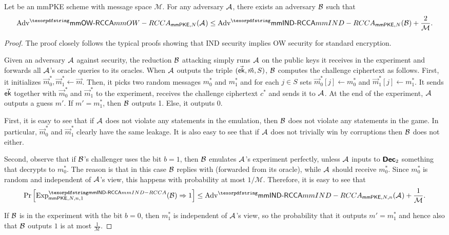 \begin{theorem}
Let \mmPKE be an mmPKE scheme with message space $\mathcal M$. For any adversary $\mathcal{A}_{\relax}$, there exists an adversary $\mathcal{B}_{\relax}$ such that
\begin{equation*}
  \textnormal{Adv}^\mmowrcca_{\mmPKE,N}(\Adv) \leq \textnormal{Adv}^\mmindrcca_{\mmPKE,N}(\Bdv) + \frac{2}{\mathcal M}.
\end{equation*}
\end{theorem}
\begin{proof}
  The proof closely follows the typical proofs showing that IND security implies OW security for standard encryption.
  
  Given an adversary $\mathcal{A}_{\relax}$ against \mmowrcca security, the reduction $\mathcal{B}_{\relax}$ attacking \mmindrcca simply runs $\mathcal{A}_{\relax}$ on the public keys it receives in the \mmindrcca experiment and forwards all $\mathcal{A}_{\relax}$'s oracle queries to its \mmindrcca oracles.
  When $\mathcal{A}_{\relax}$ outputs the triple $(\vec{{\mathsf{ek}}}, \vec m, S)$, $\mathcal{B}_{\relax}$ computes the challenge ciphertext as follows.
  First, it initializes $\vec m_0^*, \vec m_1^* \gets \vec m$. Then, it picks two random messages $m_0^*$ and $m_1^*$ and for each $j\in S$ sets $\vec m_0^*[j] \gets m_0^*$ and $\vec m_1^*[j] \gets m_1^*$. It sends $\vec{{\mathsf{ek}}}$ together with $\vec m_0^*$ and $\vec m_1^*$ to the \mmindrcca experiment, receives the challenge ciphertext $c^*$ and sends it to $\mathcal{A}_{\relax}$.
  At the end of the experiment, $\mathcal{A}_{\relax}$ outputs a guess $m'$. If $m'=m_1^*$, then $\mathcal{B}_{\relax}$ outputs 1. Else, it outputs 0.

  First, it is easy to see that if $\mathcal{A}_{\relax}$ does not violate any \KwReq{} statements in the emulation, then $\mathcal{B}_{\relax}$ does not violate any \KwReq{} statements in the \mmindrcca game. In particular, $\vec m_0^*$ and $\vec m_1^*$ clearly have the same leakage.
  It is also easy to see that if $\mathcal{A}_{\relax}$ does not trivially win by corruptions then $\mathcal{B}_{\relax}$ does not either.

  Second, observe that if $\mathcal{B}_{\relax}$'s challenger uses the bit $b=1$, then $\mathcal{B}_{\relax}$ emulates $\mathcal{A}_{\relax}$'s experiment perfectly, unless $\mathcal{A}_{\relax}$ inputs to $\textnormal{\textsf{\bfseries Dec}}_2$ something that decrypts to $m_0^*$. The reason is that in this case $\mathcal{B}_{\relax}$ replies with  (forwarded from its oracle), while $\mathcal{A}_{\relax}$ should receive $m_0^*$. Since $m_0^*$ is random and independent of $\mathcal{A}_{\relax}$'s view, this happens with probability at most $1/\mathcal M$. Therefore, it is easy to see that
  \[\Pr\left[\experiment{\mmindrcca}{\mmPKE,N,n,1}(\Bdv)\Rightarrow 1\right] \leq \textnormal{Adv}^\mmindrcca_{\mmPKE,N,n}(\Adv) + \frac{1}{\mathcal M}.\]

  If $\mathcal{B}_{\relax}$ is in the experiment with the bit $b=0$, then $m_1^*$ is independent of $\mathcal{A}_{\relax}$'s view, so the probability that it outputs $m'=m_1^*$ and hence also that $\mathcal{B}_{\relax}$ outputs $1$ is at most $\frac{1}{\mathcal M}$.
\end{proof}

